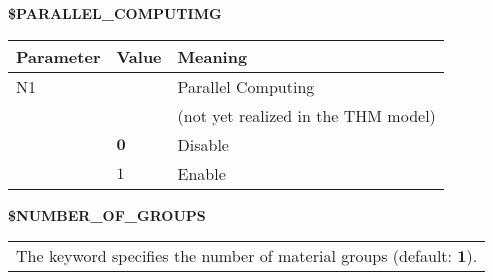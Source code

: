 \vspace{0.5cm}

\hspace{1cm} {\bf \$PARALLEL\_COMPUTIMG}

\begin{center}
\begin{tabular*}{13cm}{|p{}|p{}|p{8.5cm}|} \hline
Parameter& Value & Meaning \\ \hline \hline
%
N1 &     & Parallel Computing \\
   &     & (not yet realized in the THM model) \\
   &$\mathbf 0$ & Disable \\
   &$1$ & Enable \\ \hline
\end{tabular*}
\end{center}

\vspace{0.5cm}

\hspace{1cm} {\bf \$NUMBER\_OF\_GROUPS}

\begin{center}
\begin{tabular*}{13.5cm}{p{}}
The keyword specifies the number of material groups (default: $\mathbf 1$).
\end{tabular*}
\end{center}

\newpage
